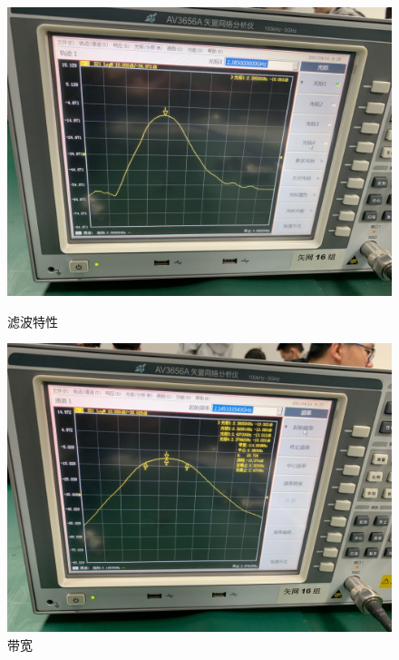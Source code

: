 \documentclass{../source/Experiment}
\begin{document}
        \begin{figure}[H]
            \centering
            \begin{minipage}[t]{0.48\textwidth}
                \centering
                \includegraphics[width=1\textwidth]{pic/滤波特性}
                \caption{滤波特性}
            \end{minipage}
            \begin{minipage}[t]{0.48\textwidth}
                \centering
                \includegraphics[width=1\textwidth]{pic/带宽}
                \caption{带宽}
            \end{minipage}
        \end{figure}
\end{document}
